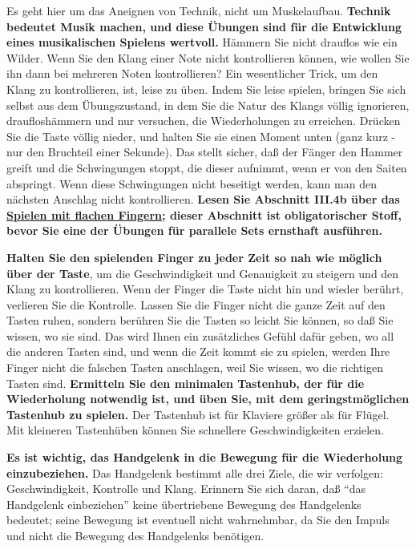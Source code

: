 Es geht hier um das Aneignen von Technik, nicht um Muskelaufbau.
\textbf{Technik bedeutet Musik machen, und diese Übungen sind für die Entwicklung eines musikalischen Spielens wertvoll.}
Hämmern Sie nicht drauflos wie ein Wilder.
Wenn Sie den Klang einer Note nicht kontrollieren können, wie wollen Sie ihn dann bei mehreren Noten kontrollieren?
Ein wesentlicher Trick, um den Klang zu kontrollieren, ist, leise zu üben.
Indem Sie leise spielen, bringen Sie sich selbst aus dem Übungszustand, in dem Sie die Natur des Klangs völlig ignorieren, draufloshämmern und nur versuchen, die Wiederholungen zu erreichen.
Drücken Sie die Taste völlig nieder, und halten Sie sie einen Moment unten (ganz kurz - nur den Bruchteil einer Sekunde).
Das stellt sicher, daß der Fänger den Hammer greift und die Schwingungen stoppt, die dieser aufnimmt, wenn er von den Saiten abspringt.
Wenn diese Schwingungen nicht beseitigt werden, kann man den nächsten Anschlag nicht kontrollieren.
\textbf{Lesen Sie Abschnitt III.4b über das \hyperref[c1iii4b]{Spielen mit flachen Fingern}; dieser Abschnitt ist obligatorischer Stoff, bevor Sie eine der Übungen für parallele Sets ernsthaft ausführen.}

\textbf{Halten Sie den spielenden Finger zu jeder Zeit so nah wie möglich über der Taste}, um die Geschwindigkeit und Genauigkeit zu steigern und den Klang zu kontrollieren.
Wenn der Finger die Taste nicht hin und wieder berührt, verlieren Sie die Kontrolle.
Lassen Sie die Finger nicht die ganze Zeit auf den Tasten ruhen, sondern berühren Sie die Tasten so leicht Sie können, so daß Sie wissen, wo sie sind.
Das wird Ihnen ein zusätzliches Gefühl dafür geben, wo all die anderen Tasten sind, und wenn die Zeit kommt sie zu spielen, werden Ihre Finger nicht die falschen Tasten anschlagen, weil Sie wissen, wo die richtigen Tasten sind.
\textbf{Ermitteln Sie den minimalen Tastenhub, der für die Wiederholung notwendig ist, und üben Sie, mit dem geringstmöglichen Tastenhub zu spielen.}
Der Tastenhub ist für Klaviere größer als für Flügel.
Mit kleineren Tastenhüben können Sie schnellere Geschwindigkeiten erzielen.

\textbf{Es ist wichtig, das Handgelenk in die Bewegung für die Wiederholung einzubeziehen.}
Das Handgelenk bestimmt alle drei Ziele, die wir verfolgen: Geschwindigkeit, Kontrolle und Klang.
Erinnern Sie sich daran, daß \enquote{das Handgelenk einbeziehen} keine übertriebene Bewegung des Handgelenks bedeutet; seine Bewegung ist eventuell nicht wahrnehmbar, da Sie den Impuls und nicht die Bewegung des Handgelenks benötigen.

